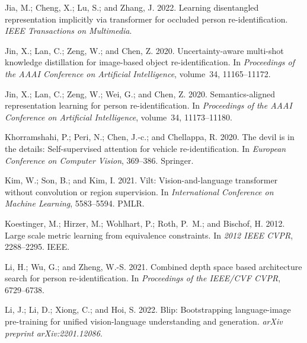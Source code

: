 \documentclass[letterpaper]{article} \usepackage{aaai23}  \usepackage{times}  \usepackage{helvet}  \usepackage{courier}  \usepackage[hyphens]{url}  \usepackage{graphicx} \urlstyle{rm} \def\UrlFont{\rm}  \usepackage{natbib}  \usepackage{caption} \frenchspacing  \setlength{\pdfpagewidth}{8.5in}  \setlength{\pdfpageheight}{11in}  \usepackage{algorithm}
\begin{document}
\begin{small}
\begin{thebibliography}{65}
Jia, M.; Cheng, X.; Lu, S.; and Zhang, J. 2022.
\newblock Learning disentangled representation implicitly via transformer for
  occluded person re-identification.
\newblock \emph{IEEE Transactions on Multimedia}.

Jin, X.; Lan, C.; Zeng, W.; and Chen, Z. 2020{}.
\newblock Uncertainty-aware multi-shot knowledge distillation for image-based
  object re-identification.
\newblock In \emph{Proceedings of the AAAI Conference on Artificial
  Intelligence}, volume~34, 11165--11172.

Jin, X.; Lan, C.; Zeng, W.; Wei, G.; and Chen, Z. 2020{}.
\newblock Semantics-aligned representation learning for person
  re-identification.
\newblock In \emph{Proceedings of the AAAI Conference on Artificial
  Intelligence}, volume~34, 11173--11180.

Khorramshahi, P.; Peri, N.; Chen, J.-c.; and Chellappa, R. 2020.
\newblock The devil is in the details: Self-supervised attention for vehicle
  re-identification.
\newblock In \emph{European Conference on Computer Vision}, 369--386. Springer.

Kim, W.; Son, B.; and Kim, I. 2021.
\newblock Vilt: Vision-and-language transformer without convolution or region
  supervision.
\newblock In \emph{International Conference on Machine Learning}, 5583--5594.
  PMLR.

Koestinger, M.; Hirzer, M.; Wohlhart, P.; Roth, P.~M.; and Bischof, H. 2012.
\newblock Large scale metric learning from equivalence constraints.
\newblock In \emph{2012 IEEE CVPR}, 2288--2295. IEEE.

Li, H.; Wu, G.; and Zheng, W.-S. 2021.
\newblock Combined depth space based architecture search for person
  re-identification.
\newblock In \emph{Proceedings of the IEEE/CVF CVPR}, 6729--6738.

Li, J.; Li, D.; Xiong, C.; and Hoi, S. 2022.
\newblock Blip: Bootstrapping language-image pre-training for unified
  vision-language understanding and generation.
\newblock \emph{arXiv preprint arXiv:2201.12086}.


\end{thebibliography}
\end{small}
\end{document}
